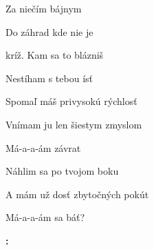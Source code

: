 \begin{song}
\bigskip

 Za niečím bájnym \par
{} Do záhrad kde nie je \par
{}kríž. Kam sa to blázniš \par
Nestíham s tebou ísť \par

\bigskip

Spomaľ máš privysokú rýchlosť \par
{}Vnímam ju len šiestym zmyslom \par
{}Má-a-a-ám závrat  \par
{}Náhlim sa po tvojom boku \par
A mám už dosť zbytočných pokút \par
{}Má-a-a-ám sa báť?  \par

\bigskip

\Outro\textbf{:} \par
{}    \par
{}    \par

\end{song}
